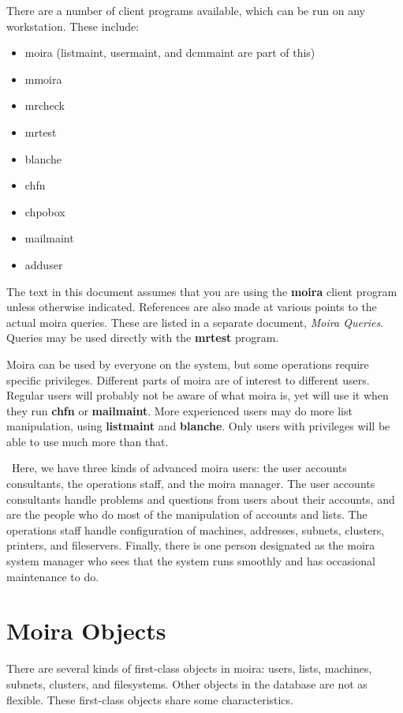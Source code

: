 There are a number of client programs available, which can be run on
any workstation.  These include:
\begin{itemize}
\item moira (listmaint, usermaint, and dcmmaint are part of this)
\item mmoira
\item mrcheck
\item mrtest
\item blanche
\item chfn
\item chpobox
\item mailmaint
\item adduser
\end{itemize}
The text in this document assumes that you are using the {\bf moira}
client program unless otherwise indicated.  References are also made
at various points to the actual moira queries.  These are listed in a
separate document, {\em Moira Queries}.  Queries may be used directly
with the {\bf mrtest} program.

Moira can be used by everyone on the system, but some operations
require specific privileges.  Different parts of moira
are of interest to different users.  Regular users will probably not
be aware of what moira is, yet will use it when they run {\bf chfn} or
{\bf mailmaint}.  More experienced users may do more list manipulation,
using {\bf listmaint} and {\bf blanche}.  Only users with privileges will
be able to use much more than that.

\athena\ Here, we have three kinds of advanced moira users: the user
accounts consultants, the operations staff, and the moira manager.
The user accounts consultants handle problems and questions from users
about their accounts, and are the people who do most of the
manipulation of accounts and lists.  The operations staff handle
configuration of machines, addresses, subnets, clusters, printers, and
fileservers.  Finally, there is one person designated as the moira
system manager who sees that the system runs smoothly and has
occasional maintenance to do.

\section{Moira Objects}

There are several kinds of first-class objects in moira: users, lists,
machines, subnets, clusters, and filesystems.  Other objects in the
database are not as flexible.  These first-class objects share some
characteristics.

